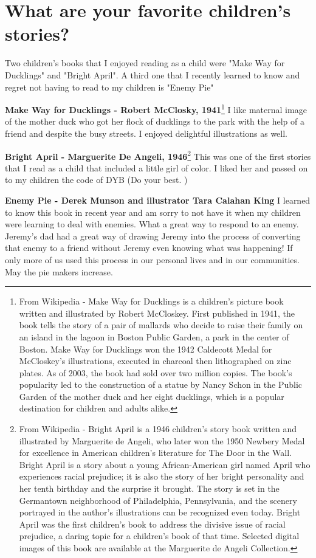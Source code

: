 \section{What are your favorite children's stories?}
Two children's books that I enjoyed reading as a child were "Make Way for Ducklings" and "Bright April".
A third one that I recently learned to know and regret not having to read to my children is "Enemy Pie"

\textbf{Make Way for Ducklings - Robert McClosky, 1941}\footnote{
From Wikipedia - Make Way for Ducklings is a children's picture book written and illustrated by Robert McCloskey.
First published in 1941, the book tells the story of a pair of mallards who decide to raise their family on an island in the lagoon in Boston Public Garden, a park in the center of Boston.
Make Way for Ducklings won the 1942 Caldecott Medal for McCloskey's illustrations, executed in charcoal then lithographed on zinc plates.
As of 2003, the book had sold over two million copies.
The book's popularity led to the construction of a statue by Nancy Schon in the Public Garden of the mother duck and her eight ducklings, which is a popular destination for children and adults alike.}
I like maternal image of the mother duck who got her flock of ducklings to the park with the help of a friend and despite the busy streets.
I enjoyed delightful illustrations as well.

\textbf{Bright April - Marguerite De Angeli, 1946}\footnote{ 
From Wikipedia - Bright April is a 1946 children's story book written and illustrated by Marguerite de Angeli, who later won the 1950 Newbery Medal for excellence in American children's literature for The Door in the Wall.
Bright April is a story about a young African-American girl named April who experiences racial prejudice; it is also the story of her bright personality and her tenth birthday and the surprise it brought.
The story is set in the Germantown neighborhood of Philadelphia, Pennsylvania, and the scenery portrayed in the author's illustrations can be recognized even today.
Bright April was the first children's book to address the divisive issue of racial prejudice, a daring topic for a children's book of that time.
Selected digital images of this book are available at the Marguerite de Angeli Collection.}
This was one of the first stories that I read as a child that included a little girl of color.
I liked her and passed on to my children the code of DYB (Do your best.
)

\textbf{Enemy Pie - Derek Munson and illustrator Tara Calahan King} 
I learned to know this book in recent year and am sorry to not have it when my children were learning to deal with enemies.
What a great way to respond to an enemy.
Jeremy's dad had a great way of drawing Jeremy into the process of converting that enemy to a friend without Jeremy even knowing what was happening! If only more of us used this process in our personal lives and in our communities.
May the pie makers increase.
